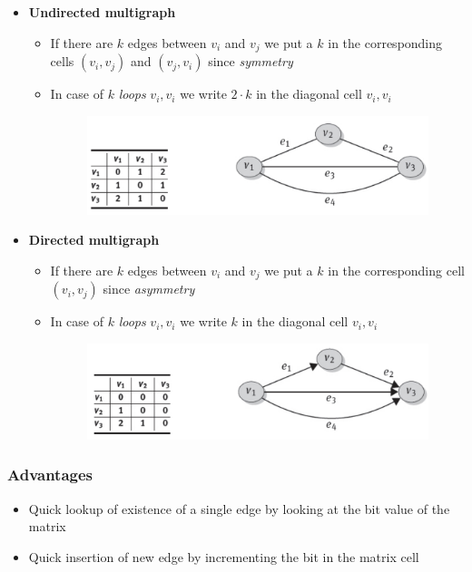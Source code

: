\begin{itemize}
\begin{itemize}
    \end{itemize}
    \item \textbf{Undirected multigraph}
    \begin{itemize}
        \item If there are \(k\) edges between \(v_i\) and \(v_j\) we put a \(k\) in the corresponding cells \((v_i, v_j)\) and \((v_j, v_i)\) since \textit{symmetry}
        \item In case of \(k\) \textit{loops} \(v_i, v_i\) we write \(2 \cdot k\) in the diagonal cell \(v_i, v_i\)
    
        \begin{figure}[!h]
        \centering
        \includegraphics[width=0.7\linewidth]{images/AdvancedDataManagment/graph_databases/adj_matrix_multi_undirected.jpeg}
        \end{figure}
        
    \end{itemize}
    \item \textbf{Directed multigraph}
    \begin{itemize}
        \item If there are \(k\) edges between \(v_i\) and \(v_j\) we put a \(k\) in the corresponding cell \((v_i, v_j)\) since \textit{asymmetry}
        \item In case of \(k\) \textit{loops} \(v_i, v_i\) we write \(k\) in the diagonal cell \(v_i, v_i\)
    
        \begin{figure}[!h]
        \centering
        \includegraphics[width=0.7\linewidth]{images/AdvancedDataManagment/graph_databases/adj_matrix_multi_directed.jpeg}
        \end{figure}
        
    \end{itemize}
\end{itemize}
\subsubsection{Advantages}
\begin{itemize}
    \item Quick lookup of existence of a single edge by looking at the bit value of the matrix
    \item Quick insertion of new edge by incrementing the bit in the matrix cell
\end{itemize}

